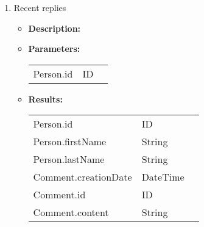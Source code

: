 {\begin{enumerate}
	\item Recent replies
	\begin{itemize}
		\item \textbf{Description:}
		\item \textbf{Parameters:} \\
			\begin{tabular}{lll}
				Person.id 	 						& ID & \parbox[t]{20cm}{\par \strut} \\
			\end{tabular}		
		\item \textbf{Results:} \\
			\begin{tabular}{lll}
				Person.id 	 				& ID & \parbox[t]{20cm}{\par \strut} \\
				Person.firstName 	 		& String & \parbox[t]{20cm}{\par \strut} \\
				Person.lastName 	 		& String & \parbox[t]{20cm}{\par \strut} \\
				Comment.creationDate 	 	& DateTime & \parbox[t]{20cm}{\par \strut} \\
				Comment.id 	 				& ID & \parbox[t]{20cm}{\par \strut} \\
				Comment.content 	 		& String & \parbox[t]{20cm}{\par \strut} \\
			\end{tabular}		
	\end{itemize}
		

\end{enumerate}}
